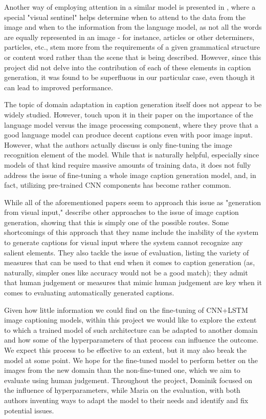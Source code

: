 \documentclass[11pt]{article}
\begin{document}
Another way of employing attention in a similar model is presented in \cite{lu16}, where a special "visual sentinel" helps determine when to attend to the data from the image and when to the information from the language model, as not all the words are equally represented in an image - for instance, articles or other determiners, particles, etc., stem more from the requirements of a given grammatical structure or content word rather than the scene that is being described. However, since this project did not delve into the contribution of each of these elements in caption generation, it was found to be superfluous in our particular case, even though it can lead to improved performance.

The topic of domain adaptation in caption generation itself does not appear to be widely studied. However, \cite{hesselSW15} touch upon it in their paper on the importance of the language model versus the image processing component, where they prove that a good language model can produce decent captions even with poor image input. However, what the authors actually discuss is only fine-tuning the image recognition element of the model. While that is naturally helpful, especially since models of that kind require massive amounts of training data, it does not fully address the issue of fine-tuning a whole image caption generation model, and, in fact, utilizing pre-trained CNN components has become rather common.

While all of the aforementioned papers seem to approach this issue as "generation from visual input," \cite{bernardi16} describe other approaches to the issue of image caption generation, showing that this is simply one of the possible routes. Some shortcomings of this approach that they name include the inability of the system to generate captions for visual input where the system cannot recognize any salient elements. They also tackle the issue of evaluation, listing the variety of measures that can be used to that end when it comes to caption generation (as, naturally, simpler ones like accuracy would not be a good match); they admit that human judgement or measures that mimic human judgement are key when it comes to evaluating automatically generated captions.

Given how little information we could find on the fine-tuning of CNN+LSTM image captioning models, within this project we would like to explore the extent to which a trained model of such architecture can be adapted to another domain and how some of the hyperparameters of that process can influence the outcome. We expect this process to be effective to an extent, but it may also break the model at some point. We hope for the fine-tuned model to perform better on the images from the new domain than the non-fine-tuned one, which we aim to evaluate using human judgement. Throughout the project, Dominik focused on the influence of hyperparameters, while Maria on the evaluation, with both authors inventing ways to adapt the model to their needs and identify and fix potential issues.
\end{document}
